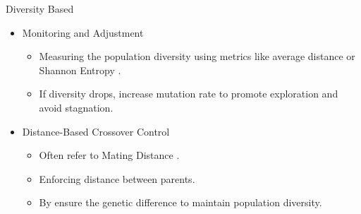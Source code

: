     \begin{frame}{Diversity Based}
        \begin{itemize}
            \item Monitoring and Adjustment
                \begin{itemize}
                    \item Measuring the population diversity using metrics like average distance\cite{fish,OSUNAENCISO2022192} or Shannon Entropy\cite{Stark2012ANS} .
                    \item If diversity drops, increase mutation rate to promote exploration and avoid stagnation.
                \end{itemize}
            \item Distance-Based Crossover Control
                \begin{itemize}
                    \item Often refer to Mating Distance \cite{eshelman1991preventing}.
                    \item Enforcing distance between parents.
                    \item By ensure the genetic difference to maintain population diversity.
                \end{itemize}
        \end{itemize}
    \end{frame}